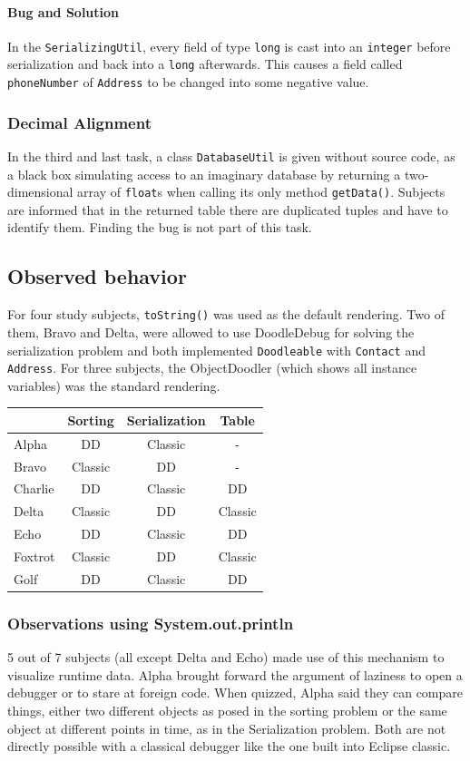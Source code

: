 \documentclass[english]{scrartcl}
\newcommand{\DD}{Dood\-le\-De\-bug\xspace}
\begin{document}
\paragraph{Bug and Solution}
In the \texttt{SerializingUtil}, every field of type \texttt{long} is cast %
into an \texttt{integer} before serialization and back into a \texttt{long} afterwards.
This causes a field called \texttt{phoneNumber} of \texttt{Address} to be changed into some negative value.

\subsubsection{Decimal Alignment}
In the third and last task, a class \texttt{DatabaseUtil} is given without source code, as a black box simulating access to an imaginary database by returning a two-dimensional array of \texttt{float}s when calling its only method \texttt{getData()}.
Subjects are informed that in the returned table there are duplicated tuples and have to identify them.
Finding the bug is not part of this task.

\subsection{Observed behavior}
For four study subjects, \texttt{toString()} was used as the default rendering.
Two of them, Bravo and Delta, were allowed to use \DD for solving the serialization problem and both implemented \texttt{Doodleable} with \texttt{Contact} and \texttt{Address}.
For three subjects, the ObjectDoodler (which shows all instance variables) was the standard rendering.

\begin{tabular}{l | c c c}
\label{tool-usage-table}
 & \textbf{Sorting} & \textbf{Serialization} & \textbf{Table} \\
\hline
Alpha & DD & Classic & - \\
Bravo & Classic & DD & - \\
Charlie & DD & Classic & DD \\
Delta & Classic & DD & Classic \\
Echo & DD & Classic & DD \\
Foxtrot & Classic & DD & Classic \\
Golf & DD & Classic & DD \\
\end{tabular}

\subsubsection{Observations using System.out.println}
5 out of 7 subjects (all except Delta and Echo) made use of this mechanism to visualize runtime data.
Alpha brought forward the argument of laziness to open a debugger or to stare at foreign code.
When quizzed, Alpha said they can compare things, either two different objects as posed in the sorting problem or the same object at different points in time, as in the Serialization problem.
Both are not directly possible with a classical debugger like the one built into Eclipse classic.
\end{document}
